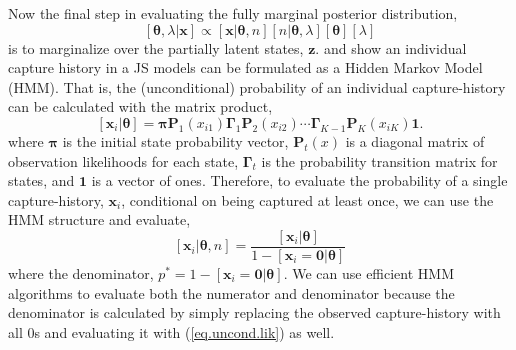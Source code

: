 \documentclass[12pt]{article}
\newcommand{\bx}{\ensuremath{\mathbf{x}}}
\newcommand{\bP}{\ensuremath{\mathbf{P}}}
\newcommand{\bz}{\ensuremath{\mathbf{z}}}
\newcommand{\bpi}{\ensuremath{\boldsymbol{\pi}}}
\newcommand{\bG}{\ensuremath{\boldsymbol{\Gamma}}}
\newcommand{\bt}{\ensuremath{\boldsymbol{\theta}}}
\begin{document}
Now the final step in evaluating the fully marginal posterior distribution, 
\[
[\bt,\lambda|\bx] \propto [\bx|\bt,n][n|\bt,\lambda][\bt][\lambda]
\]
is to marginalize over the partially latent states, $\bz$. \cite{glennie2019open} and \cite{mcclintock2020uncovering} show an individual capture history in a JS models can be formulated as a Hidden Markov Model (HMM). That is, the (unconditional) probability of an individual capture-history can be calculated with the matrix product,
%
\begin{equation}
\label{eq.uncond.lik}
[\bx_i|\bt] = \bpi\bP_1(x_{i1})\bG_1\bP_2(x_{i2}) \cdots \bG_{K-1}\bP_K(x_{iK})\mathbf{1}.
\end{equation}
where $\bpi$ is the initial state probability vector, $\bP_t(x)$ is a diagonal matrix of observation likelihoods for each state, $\bG_t$ is the probability transition matrix for states, and $\mathbf{1}$ is a vector of ones. Therefore, to evaluate the probability of a single capture-history, $\bx_i$, conditional on being captured at least once, we can use the HMM structure and evaluate,
\begin{equation}
\label{eq:dJS}
 [\bx_i|\bt,n]  = \frac{[\bx_i|\bt]}{1-[\bx_i=\mathbf{0}|\bt]}
\end{equation}
where the denominator, $p^*=1-[\bx_i=\mathbf{0}|\bt]$. We can use efficient HMM algorithms to evaluate both the numerator and denominator because the denominator is calculated by simply replacing the observed capture-history with all 0s and evaluating it with (\ref{eq.uncond.lik}) as well.
\end{document}
